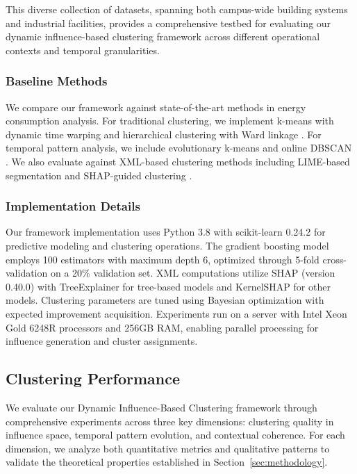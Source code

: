 \documentclass[final,5p,times,twocolumn,numbers]{elsarticle}
\begin{document}
This diverse collection of datasets, spanning both campus-wide building systems and industrial facilities, provides a comprehensive testbed for evaluating our dynamic influence-based clustering framework across different operational contexts and temporal granularities.

\subsubsection{Baseline Methods}
We compare our framework against state-of-the-art methods in energy consumption analysis. For traditional clustering, we implement k-means with dynamic time warping \cite{dtw_kmeans} and hierarchical clustering with Ward linkage \cite{ward}. For temporal pattern analysis, we include evolutionary k-means \cite{evo_kmeans} and online DBSCAN \cite{ester1996density}. We also evaluate against XML-based clustering methods including LIME-based segmentation \cite{lime_cluster} and SHAP-guided clustering \cite{shap_cluster}.

\subsubsection{Implementation Details}
Our framework implementation uses Python 3.8 with scikit-learn 0.24.2 for predictive modeling and clustering operations. The gradient boosting model employs 100 estimators with maximum depth 6, optimized through 5-fold cross-validation on a 20\% validation set. XML computations utilize SHAP (version 0.40.0) with TreeExplainer for tree-based models and KernelSHAP for other models. Clustering parameters are tuned using Bayesian optimization with expected improvement acquisition. Experiments run on a server with Intel Xeon Gold 6248R processors and 256GB RAM, enabling parallel processing for influence generation and cluster assignments.

\subsection{Clustering Performance}
We evaluate our Dynamic Influence-Based Clustering framework through comprehensive experiments across three key dimensions: clustering quality in influence space, temporal pattern evolution, and contextual coherence. For each dimension, we analyze both quantitative metrics and qualitative patterns to validate the theoretical properties established in Section~\ref{sec:methodology}.
\end{document}
